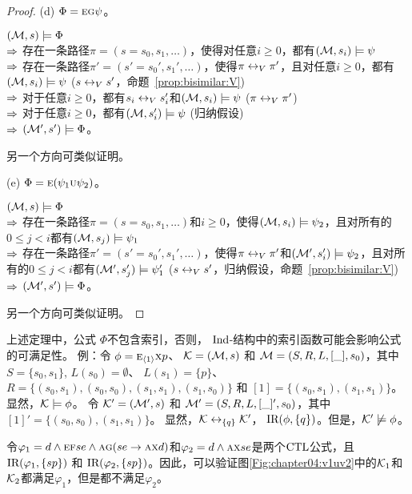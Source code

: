 \begin{proof}
	(d) $\Phi = \textsc{e} \textsc{g} \psi$。
	
	$({\cal M},s)\models \Phi$\\
	$\Rightarrow$ 存在一条路径$\pi=(s=s_0,s_1,\dots)$，使得对任意$i\ge 0$，都有$({\cal M},s_i)\models \psi$\\
	$\Rightarrow$ 存在一条路径$\pi'=(s'=s_0',s_1',\dots)$，使得$\pi \leftrightarrow_V \pi'$，且对任意$i\ge 0$，都有$({\cal M},s_i)\models \psi$   \hfill ($s \leftrightarrow_V s'$，命题~\ref{prop:bisimilar:V})\\
	$\Rightarrow$ 对于任意$i\ge 0$，都有$s_i \leftrightarrow_V s_i'$和$({\cal M},s_i)\models \psi$ \hfill ($\pi \leftrightarrow_V \pi'$)\\
	$\Rightarrow$ 对于任意$i\ge 0$，都有$({\cal M},s_i') \models \psi$ \hfill (归纳假设)\\
	$\Rightarrow$ $({\cal M}',s')\models \Phi$。
	
	另一个方向可类似证明。
	
	(e) $\Phi = \textsc{e} (\psi_1 \textsc{u} \psi_2)$。
	
	$({\cal M},s) \models \Phi$\\
	$\Rightarrow$ 存在一条路径$\pi=(s=s_0,s_1,\dots)$和$i \ge 0$，使得$({\cal M},s_i) \models \psi_2$，且对所有的$0\leq j <i$都有$({\cal M},s_j)\models \psi_1$\\
	$\Rightarrow$ 存在一条路径$\pi'=(s'=s_0',s_1',\dots)$，使得$\pi \leftrightarrow_V \pi'$和$({\cal M}',s_i') \models \psi_2$，且对所有的$0\leq j <i$都有$({\cal M}',s_j')\models \psi_1'$ \hfill ($s \leftrightarrow_V s'$，归纳假设，命题~\ref{prop:bisimilar:V})\\
	$\Rightarrow$ $({\cal M}',s')\models \Phi$。
	
	另一个方向可类似证明。
\end{proof}

上述定理中，公式 $\Phi$不包含索引，否则， $\textrm{Ind}$-结构中的索引函数可能会影响公式的可满足性。
例：令 $\phi=\textsc{e}_{{\langle{1}\rangle}}\textsc{x} p$、
${\cal K}=({\cal M},s)$ 和 ${\cal M}=(S,R,L,[\_],s_0)$，其中 $S=\{s_0,s_1\}$, $L(s_0)=\emptyset$、 $L(s_1)=\{p\}$、
$R=\{(s_0,s_1),(s_0,s_0),(s_1,s_1), (s_1,s_0)\}$ 和 $[1]=\{(s_0,s_1), (s_1,s_1)\}$。显然，${\cal K}\models\phi$。
令 ${\cal K}'=({\cal M}',s)$ 和 ${\cal M}'=(S,R,L,[\_]',s_0)$，其中 $[1]'=\{(s_0,s_0),(s_1,s_1)\}$。
显然，${\cal K}\leftrightarrow_{\{q\}}{\cal K}'$， $\textrm{IR}(\phi,\{q\})$。但是，${\cal K}'\not\models\phi$。

\begin{example}
	令$\varphi_1 = d \wedge \textsc{e}\textsc{f} se \wedge \textsc{a}\textsc{g}(se \rightarrow \textsc{a}\textsc{x} d)$和$\varphi_2=d \wedge \textsc{a}\textsc{x} se$是两个$\textrm{CTL}$公式，且$\textrm{IR}(\varphi_1,\{sp\})$ 和 $\textrm{IR}(\varphi_2,\{sp\})$。因此，可以验证图\ref{Fig:chapter04:v1uv2}中的${\cal K}_1$和${\cal K}_2$都满足$\varphi_1$，但是都不满足$\varphi_2$。
\end{example}

